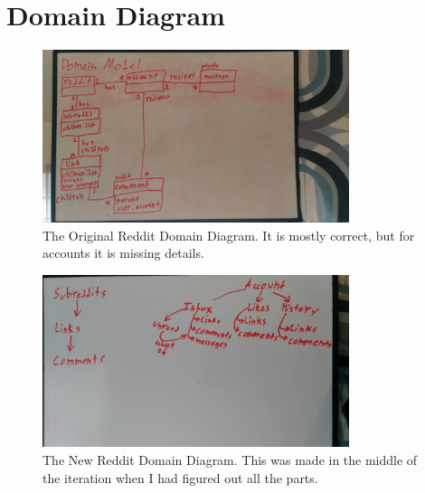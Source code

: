 \documentclass[12pt]{article}
\begin{document}
\section{Domain Diagram}
\begin{figure}[ht]
	\centering
	\caption{The Original Reddit Domain Diagram. It is mostly correct, but for accounts it is missing details.}
	\label{domain1}
	\includegraphics[width=0.8\textwidth]{domain1.jpg}
	\vspace{-10pt}
\end{figure}
\begin{figure}[ht]
	\centering
	\caption{The New Reddit Domain Diagram. This was made in the middle of the iteration when I had figured out all the parts.}
	\label{domain2}
	\includegraphics[width=0.8\textwidth]{domain2.jpg}
	\vspace{-10pt}
\end{figure}

\clearpage
\end{document}
